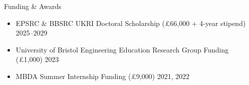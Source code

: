 
\begin{rSection}{Funding \& Awards}
    \begin{itemize}[leftmargin=1.1em, labelsep=0.5em, label=\raisebox{0.2ex}{\tiny$\bullet$}]
        \item EPSRC \& BBSRC UKRI Doctoral Scholarship (£66,000 + 4-year stipend) \hfill 2025--2029
        \item University of Bristol Engineering Education Research Group Funding (£1,000) \hfill 2023
        \item MBDA Summer Internship Funding (£9,000) \hfill 2021, 2022
    \end{itemize}
\end{rSection}
